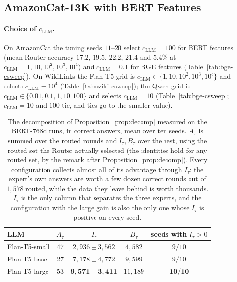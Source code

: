 \documentclass[anon]{alt2027} %
\begin{document}
\subsection{AmazonCat-13K with BERT Features}
\label{app:amazon-bert}

\paragraph{Choice of $c_{\mathrm{LLM}}$.} On AmazonCat the tuning seeds $11$--$20$ select
$c_{\mathrm{LLM}}=100$ for BERT features (mean Router accuracy $17.2$, $19.5$, $22.2$, $21.4$
and $5.4\%$ at $c_{\mathrm{LLM}}=1,10,10^2,10^3,10^4$) and $c_{\mathrm{LLM}}=0.1$ for BGE features
(Table~\ref{tab:bge-csweep}). On WikiLinks the Flan-T5 grid is
$c_{\mathrm{LLM}}\in\{1,10,10^2,10^3,10^4\}$ and selects $c_{\mathrm{LLM}}=10^4$
(Table~\ref{tab:wiki-csweep}); the Qwen grid is
$c_{\mathrm{LLM}}\in\{0.01,0.1,1,10,100\}$ and selects $c_{\mathrm{LLM}}=10$
(Table~\ref{tab:bge-csweep}; $c_{\mathrm{LLM}}=10$ and $100$ tie, and ties go to the
smaller value).

\begin{table}[ht]
\centering
\caption{The decomposition of Proposition~\ref{prop:decomp} measured on the
BERT-768d runs, in correct answers, mean over ten seeds. $A_\tau$ is summed
over the routed rounds and $I_\tau,B_\tau$ over the rest, using the routed set
the Router actually selected (the identities hold for any routed set, by the
remark after Proposition~\ref{prop:decomp}). Every configuration collects
almost all of its advantage through $I_\tau$: the expert's own answers are
worth a few dozen correct rounds out of $1{,}578$ routed, while the data they
leave behind is worth thousands. $I_\tau$ is the only column that separates
the three experts, and the configuration with the large gain is also the only one whose
$I_\tau$ is positive on every seed.}
\label{tab:amazon-decomp}
\small
\begin{tabular}{@{}lcccc@{}}
\toprule
LLM & $A_\tau$ & $I_\tau$ & $B_\tau$ & seeds with $I_\tau>0$ \\
\midrule
Flan-T5-small  & $47$ & $2{,}936\pm3{,}562$ & $4{,}582$ & $9/10$ \\
Flan-T5-base   & $27$ & $7{,}178\pm4{,}772$ & $9{,}599$ & $9/10$ \\
Flan-T5-large  & $53$ & $\mathbf{9{,}571\pm3{,}411}$ & $11{,}189$ & $\mathbf{10/10}$ \\
\bottomrule
\end{tabular}
\end{table}
\end{document}
